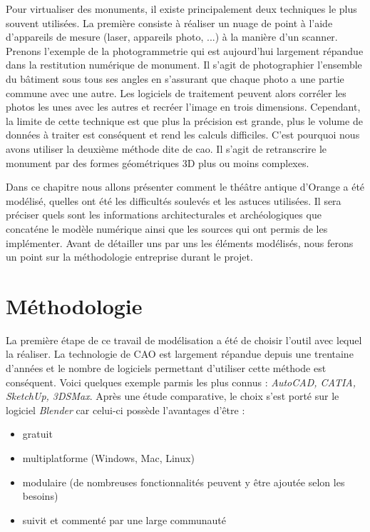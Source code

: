 Pour virtualiser des monuments, il existe principalement deux techniques le plus souvent utilisées. La première consiste à réaliser un nuage de point à l'aide d'appareils de mesure (laser, appareils photo, ...) à la manière d'un scanner. Prenons l'exemple de la photogrammetrie qui est aujourd'hui largement répandue dans la restitution numérique de monument. Il s'agit de photographier l'ensemble du bâtiment sous tous ses angles en s'assurant que chaque photo a une partie commune avec une autre. Les logiciels de traitement peuvent alors corréler les photos les unes avec les autres et recréer l'image en trois dimensions. Cependant, la limite de cette technique est que plus la précision est grande, plus le volume de données à traiter est conséquent et rend les calculs difficiles. C'est pourquoi nous avons utiliser la deuxième méthode dite de \gls{cao}. Il s'agit de retranscrire le monument par des formes géométriques 3D plus ou moins complexes.

Dans ce chapitre nous allons présenter comment le théâtre antique d'Orange a été modélisé, quelles ont été les difficultés soulevés et les astuces utilisées. Il sera préciser quels sont les informations architecturales et archéologiques que concaténe le modèle numérique ainsi que les sources qui ont permis de les implémenter.
Avant de détailler uns par uns les éléments modélisés, nous ferons un point sur la méthodologie entreprise durant le projet.


\section{Méthodologie}
La première étape de ce travail de modélisation a été de choisir l'outil avec lequel la réaliser. La technologie de CAO est largement répandue depuis une trentaine d'années et le nombre de logiciels permettant d'utiliser cette méthode est conséquent. Voici quelques exemple parmis les plus connus : \textit{AutoCAD, CATIA, SketchUp, 3DSMax}. Après une étude comparative, le choix s'est porté sur le logiciel \textit{Blender} car celui-ci possède l'avantages d'être :

\begin{itemize}
	\item gratuit
	\item multiplatforme (Windows, Mac, Linux)
	\item modulaire (de nombreuses fonctionnalités peuvent y être ajoutée selon les besoins)
	\item suivit et commenté par une large communauté
\end{itemize}

